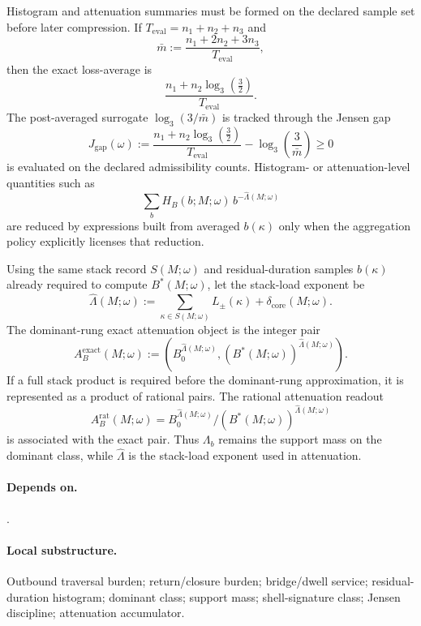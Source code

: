 \begin{definition}
\label{def:jensen-discipline}
Histogram and attenuation summaries must be formed on the declared sample set before later compression. If $T_{\mathrm{eval}}=n_1+n_2+n_3$ and
\[
\bar m:=\frac{n_1+2n_2+3n_3}{T_{\mathrm{eval}}},
\]
then the exact loss-average is
\[
\frac{n_1+n_2\log_3\!\left(\frac{3}{2}\right)}{T_{\mathrm{eval}}}.
\]
The post-averaged surrogate $\log_3(3/\bar m)$ is tracked through the Jensen gap
\[
J_{\mathrm{gap}}(\omega):=
\frac{n_1+n_2\log_3\!\left(\frac{3}{2}\right)}{T_{\mathrm{eval}}}
-
\log_3\!\left(\frac{3}{\bar m}\right)\ge 0
\]
is evaluated on the declared admissibility counts. Histogram- or attenuation-level quantities such as
\[
\sum_b H_B(b;M;\omega)\,b^{-\widehat\Lambda(M;\omega)}
\]
are reduced by expressions built from averaged $b(\kappa)$ only when the aggregation policy explicitly licenses that reduction.
\end{definition}

\begin{definition}
\label{def:attenuation-operator}
Using the same stack record $S(M;\omega)$ and residual-duration samples $b(\kappa)$ already required to compute $B^*(M;\omega)$, let the stack-load exponent be
\[
\widehat\Lambda(M;\omega):=\sum_{\kappa\in S(M;\omega)}L_{\pm}(\kappa)+\delta_{\mathrm{core}}(M;\omega).
\]
The dominant-rung exact attenuation object is the integer pair
\[
A_B^{\mathrm{exact}}(M;\omega):=
\left(B_0^{\widehat\Lambda(M;\omega)},(B^*(M;\omega))^{\widehat\Lambda(M;\omega)}\right).
\]
If a full stack product is required before the dominant-rung approximation, it is represented as a product of rational pairs. The rational attenuation readout
\[
A_B^{\mathrm{rat}}(M;\omega)=B_0^{\widehat\Lambda(M;\omega)}/(B^*(M;\omega))^{\widehat\Lambda(M;\omega)}
\]
is associated with the exact pair. Thus $\Lambda_b$ remains the support mass on the dominant class, while $\widehat\Lambda$ is the stack-load exponent used in attenuation.
\end{definition}

\paragraph{Depends on.} .
\paragraph{Local substructure.} Outbound traversal burden; return/closure burden; bridge/dwell service; residual-duration histogram; dominant class; support mass; shell-signature class; Jensen discipline; attenuation accumulator.
